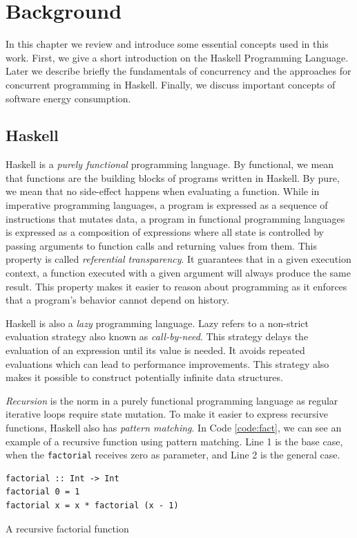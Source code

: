 \chapter{Background}
In this chapter we review and introduce some essential concepts used in this work. First, we give a short introduction on the Haskell Programming Language. Later we describe briefly the fundamentals of concurrency and the approaches for concurrent programming in Haskell. Finally, we discuss important concepts of software energy consumption.

\section{Haskell}
Haskell is a \emph{purely functional} programming language. By functional, we mean that functions are the building blocks of programs written in Haskell. By pure, we mean that no side-effect happens when evaluating a function. While in imperative programming languages, a program is expressed as a sequence of instructions that mutates data, a program in functional programming languages is expressed as a composition of expressions where all state is controlled by passing arguments to function calls and returning values from them. This property is called \emph{referential transparency}. It guarantees that in a given execution context, a function executed with a given argument will always produce the same result. This property makes it easier to reason about programming as it enforces that a program's behavior cannot depend on history.

Haskell is also a \emph{lazy} programming language. Lazy refers to a non-strict evaluation strategy also known as \emph{call-by-need}. This strategy delays the evaluation of an expression until its value is needed. It avoids repeated evaluations which can lead to performance improvements. This strategy also makes it possible to construct potentially infinite data structures.

\emph{Recursion} is the norm in a purely functional programming language as regular iterative loops require state mutation. To make it easier to express recursive functions, Haskell also has \emph{pattern matching}. In Code \ref{code:fact}, we can see an example of a recursive function using pattern matching. Line 1 is the base case, when the \texttt{factorial} receives zero as parameter, and Line 2 is the general case.

\begin{listing}
  \begin{verbatim}
factorial :: Int -> Int
factorial 0 = 1
factorial x = x * factorial (x - 1)
  \end{verbatim}
  \caption{A recursive factorial function}
  \label{code:fact}
\end{listing}

